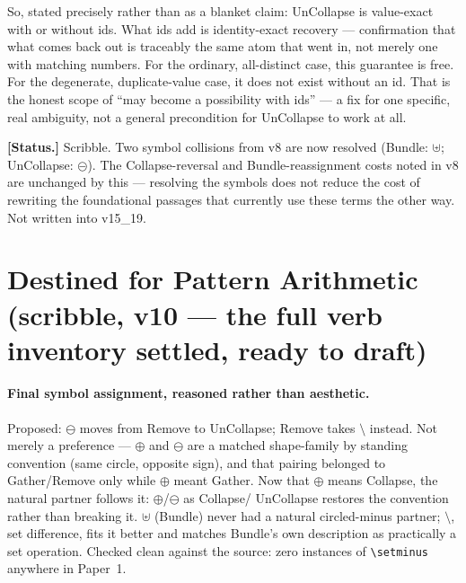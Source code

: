 \documentclass[11pt]{article}
\begin{document}
So, stated precisely rather than as a blanket claim: UnCollapse is
value-exact with or without ids. What ids add is identity-exact
recovery --- confirmation that what comes back out is traceably the
same atom that went in, not merely one with matching numbers. For the
ordinary, all-distinct case, this guarantee is free. For the
degenerate, duplicate-value case, it does not exist without an id.
That is the honest scope of ``may become a possibility with ids'' ---
a fix for one specific, real ambiguity, not a general precondition for
UnCollapse to work at all.

\textbf{[Status.]} Scribble. Two symbol collisions from v8 are now
resolved (Bundle: $\uplus$; UnCollapse: $\circleddash$). The
Collapse-reversal and Bundle-reassignment costs noted in v8 are
unchanged by this --- resolving the symbols does not reduce the cost
of rewriting the foundational passages that currently use these terms
the other way. Not written into v15\_19.





\section{Destined for Pattern Arithmetic (scribble, v10 --- the full
verb inventory settled, ready to draft)}

\paragraph{Final symbol assignment, reasoned rather than aesthetic.}
Proposed: $\ominus$ moves from Remove to UnCollapse; Remove takes
$\setminus$ instead. Not merely a preference --- $\oplus$ and
$\ominus$ are a matched shape-family by standing convention (same
circle, opposite sign), and that pairing belonged to Gather/Remove
only while $\oplus$ meant Gather. Now that $\oplus$ means Collapse,
the natural partner follows it: $\oplus$/$\ominus$ as Collapse/
UnCollapse restores the convention rather than breaking it. $\uplus$
(Bundle) never had a natural circled-minus partner; $\setminus$, set
difference, fits it better and matches Bundle's own description as
practically a set operation. Checked clean against the source: zero
instances of \texttt{\textbackslash setminus} anywhere in Paper~1.
\end{document}

